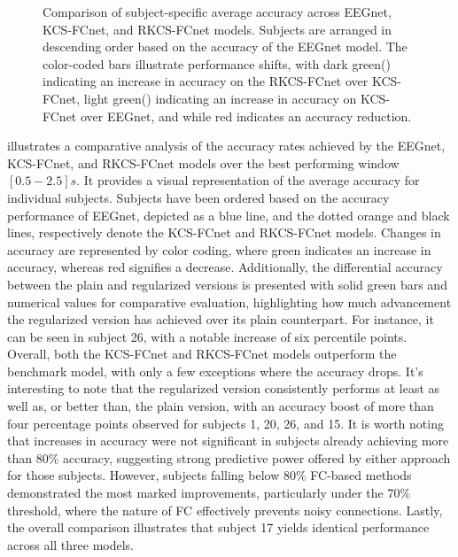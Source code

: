 \begin{figure}[h!]
  \centering
  \resizebox{\linewidth}{!}{}
  \caption{Comparison of subject-specific average accuracy across EEGnet, KCS-FCnet, and RKCS-FCnet models. Subjects are arranged in descending order based on the accuracy of the EEGnet model. The color-coded bars illustrate performance shifts, with dark green() indicating an increase in accuracy on the RKCS-FCnet over KCS-FCnet, light green() indicating an increase in accuracy on KCS-FCnet over EEGnet, and while red  indicates an accuracy reduction.}\label{fig:accuracy_sbj_comp}
\end{figure}



 illustrates a comparative analysis of the accuracy rates achieved by the EEGnet, KCS-FCnet, and RKCS-FCnet models over the best performing window $[0.5-2.5]s$. It provides a visual representation of the average accuracy for individual subjects. Subjects have been ordered based on the accuracy performance of EEGnet, depicted as a blue line, and the dotted orange and black lines, respectively denote the KCS-FCnet and RKCS-FCnet models. Changes in accuracy are represented by color coding, where green indicates an increase in accuracy, whereas red signifies a decrease. Additionally, the differential accuracy between the plain and regularized versions is presented with solid green bars and numerical values for comparative evaluation, highlighting how much advancement the regularized version has achieved over its plain counterpart. For instance, it can be seen in subject 26, with a notable increase of six percentile points. Overall, both the KCS-FCnet and RKCS-FCnet models outperform the benchmark model, with only a few exceptions where the accuracy drops. It's interesting to note that the regularized version consistently performs at least as well as, or better than, the plain version, with an accuracy boost of more than four percentage points observed for subjects 1, 20, 26, and 15. It is worth noting that increases in accuracy were not significant in subjects already achieving more than $80\%$ accuracy, suggesting strong predictive power offered by either approach for those subjects. However, subjects falling below $80\%$ FC-based methods demonstrated the most marked improvements, particularly under the $70\%$ threshold, where the nature of FC effectively prevents noisy connections. Lastly, the overall comparison illustrates that subject 17 yields identical performance across all three models.

